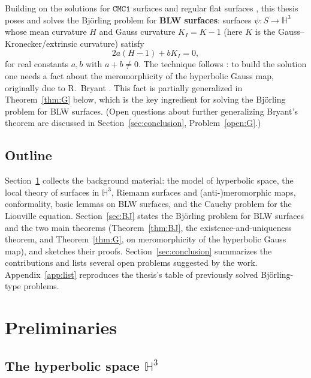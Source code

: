 \documentclass[11pt,a4paper]{article}
\newcommand{\Hyp}{\mathbb{H}^3}                      %
\theoremstyle{plain}
\theoremstyle{definition}
\theoremstyle{remark}
\begin{document}
\medskip
Building on the solutions for $\mathtt{CMC1}$ surfaces \cite{GMM1} and
regular flat surfaces \cite{GMM5}, this thesis poses and solves the
Björling problem for \textbf{BLW surfaces}: surfaces $\psi:S\to\Hyp$ whose
mean curvature $H$ and Gauss curvature $K_I=K-1$ (here $K$ is the
Gauss--Kronecker/extrinsic curvature) satisfy
\begin{equation}\label{eq:BLW}
  2a(H-1)+bK_I = 0 ,
\end{equation}
for real constants $a,b$ with $a+b\neq0$. The technique follows
\cite{GMM1}: to build the solution one needs a fact about the
meromorphicity of the hyperbolic Gauss map, originally due to
R.\ Bryant \cite{BRYANT}. This fact is partially generalized in
Theorem~\ref{thm:G} below, which is the key ingredient for solving the
Björling problem for BLW surfaces. (Open questions about further
generalizing Bryant's theorem are discussed in
Section~\ref{sec:conclusion}, Problem~\ref{open:G}.)

\subsection*{Outline}
Section~\ref{sec:prelim} collects the background material: the model of
hyperbolic space, the local theory of surfaces in $\Hyp$, Riemann
surfaces and (anti-)meromorphic maps, conformality, basic lemmas on BLW
surfaces, and the Cauchy problem for the Liouville equation.
Section~\ref{sec:BJ} states the Björling problem for BLW surfaces and the
two main theorems (Theorem~\ref{thm:BJ}, the existence-and-uniqueness
theorem, and Theorem~\ref{thm:G}, on meromorphicity of the hyperbolic
Gauss map), and sketches their proofs.
Section~\ref{sec:conclusion} summarizes the contributions and lists
several open problems suggested by the work.
Appendix~\ref{app:list} reproduces the thesis's table of previously solved
Björling-type problems.

\section{Preliminaries}\label{sec:prelim}

\subsection{The hyperbolic space $\Hyp$}\label{ssec:H3}
\end{document}
